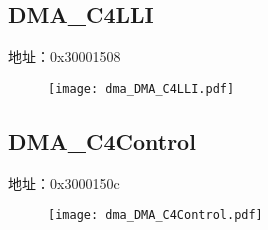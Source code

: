 \subsection{DMA\_C4LLI}
\label{dma-DMA-C4LLI}
地址：0x30001508
 \begin{figure}[H]
\texttt{[image: dma\_DMA\_C4LLI.pdf]}
\end{figure}

\subsection{DMA\_C4Control}
\label{dma-DMA-C4Control}
地址：0x3000150c
 \begin{figure}[H]
\texttt{[image: dma\_DMA\_C4Control.pdf]}
\end{figure}

